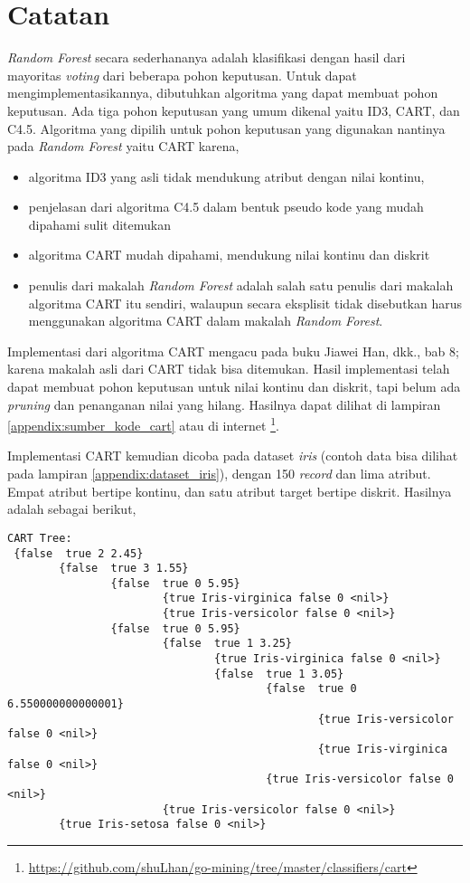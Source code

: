 \section{Catatan}

\textit{Random Forest} secara sederhananya adalah klasifikasi dengan hasil dari mayoritas \textit{voting} dari beberapa pohon keputusan.
Untuk dapat mengimplementasikannya, dibutuhkan algoritma yang dapat membuat pohon keputusan.
Ada tiga pohon keputusan yang umum dikenal yaitu ID3, CART, dan C4.5.
Algoritma yang dipilih untuk pohon keputusan yang digunakan nantinya pada \textit{Random Forest} yaitu CART karena,
\begin{itemize}
\item algoritma ID3 yang asli tidak mendukung atribut dengan nilai kontinu,
\item penjelasan dari algoritma C4.5 dalam bentuk pseudo kode yang mudah dipahami sulit ditemukan
\item algoritma CART mudah dipahami, mendukung nilai kontinu dan diskrit
\item penulis dari makalah \textit{Random Forest} adalah salah satu penulis dari makalah algoritma CART
\cite{breiman1984classification}
itu sendiri, walaupun secara eksplisit tidak disebutkan harus menggunakan algoritma CART dalam makalah \textit{Random Forest}.
\end{itemize}

Implementasi dari algoritma CART mengacu pada buku Jiawei Han, dkk.\cite{han2011data}, bab 8; karena makalah asli dari CART tidak bisa ditemukan.
Hasil implementasi telah dapat membuat pohon keputusan untuk nilai kontinu dan diskrit, tapi belum ada \textit{pruning} dan penanganan nilai yang hilang.
Hasilnya dapat dilihat di lampiran 
\ref{appendix:sumber_kode_cart}
atau di internet
\footnote{\url{https://github.com/shuLhan/go-mining/tree/master/classifiers/cart}}.

Implementasi CART kemudian dicoba pada dataset \textit{iris} (contoh data bisa dilihat pada lampiran \ref{appendix:dataset_iris}), dengan 150 \textit{record} dan lima atribut. Empat atribut bertipe kontinu, dan satu atribut target bertipe diskrit. Hasilnya adalah sebagai berikut,

\begin{lstlisting}
CART Tree:
 {false  true 2 2.45}
        {false  true 3 1.55}
                {false  true 0 5.95}
                        {true Iris-virginica false 0 <nil>}
                        {true Iris-versicolor false 0 <nil>}
                {false  true 0 5.95}
                        {false  true 1 3.25}
                                {true Iris-virginica false 0 <nil>}
                                {false  true 1 3.05}
                                        {false  true 0 6.550000000000001}
                                                {true Iris-versicolor false 0 <nil>}
                                                {true Iris-virginica false 0 <nil>}
                                        {true Iris-versicolor false 0 <nil>}
                        {true Iris-versicolor false 0 <nil>}
        {true Iris-setosa false 0 <nil>}
\end{lstlisting}

